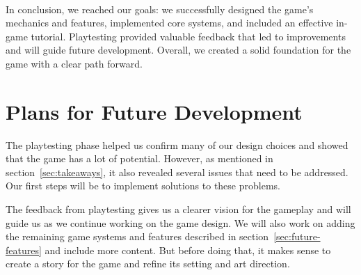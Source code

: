 \ \\

In conclusion, we reached our goals: we successfully designed the game's mechanics and features, implemented core systems, and included an effective in-game tutorial.
Playtesting provided valuable feedback that led to improvements and will guide future development.
Overall, we created a solid foundation for the game with a clear path forward.

\section{Plans for Future Development}

The playtesting phase helped us confirm many of our design choices and showed that the game has a lot of potential.
However, as mentioned in section~\ref{sec:takeaways}, it also revealed several issues that need to be addressed.
Our first steps will be to implement solutions to these problems.

The feedback from playtesting gives us a clearer vision for the gameplay and will guide us as we continue working on the game design.
We will also work on adding the remaining game systems and features described in section~\ref{sec:future-features} and include more content.
But before doing that, it makes sense to create a story for the game and refine its setting and art direction.